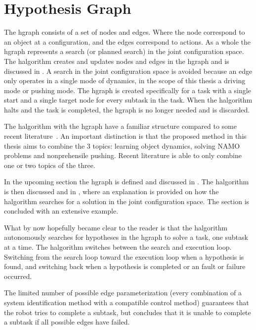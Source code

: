 \section{Hypothesis Graph}%
\label{sec:hgraph}
The \acf{hgraph} consists of a set of nodes and edges. Where the node correspond to an object at a configuration, and the edges correspond to actions. As a whole the \ac{hgraph} represents a search (or planned search) in the joint configuration space. The \ac{halgorithm} creates and updates nodes and edges in the \ac{hgraph} and is discussed in . A search in the joint configuration space is avoided because an edge only operates in a single mode of dynamics, in the scope of this thesis a driving mode or pushing mode. The \ac{hgraph} is created specifically for a task with a single start and a single target node for every subtask in the task. When the \ac{halgorithm} halts and the task is completed, the \ac{hgraph} is no longer needed and is discarded.\bs

The \ac{halgorithm} with the \ac{hgraph} have a familiar structure compared to some recent literature~\cite{ellis_navigation_2022,wang_affordancebased_2020}. An important distinction is that the proposed method in this thesis aims to combine the 3 topics: learning object dynamics, solving \ac{NAMO} problems and nonprehensile pushing. Recent literature is able to only combine one or two topics of the three.\bs

In the upcoming section the \ac{hgraph} is defined and discussed in . The \ac{halgorithm} is then discussed and in , where an explanation is provided on how the \ac{halgorithm} searches for a solution in the joint configuration space. The section is concluded with an extensive example.\bs





What by now hopefully became clear to the reader is that the \ac{halgorithm} autonomously searches for hypotheses in the \ac{hgraph} to solve a task, one subtask at a time. The \ac{halgorithm} switches between the search and execution loop. Switching from the search loop toward the execution loop when a hypothesis is found, and switching back when a hypothesis is completed or an fault or failure occurred.\bs

The limited number of possible edge parameterization (every combination of a system identification method with a compatible control method) guarantees that the robot tries to complete a subtask, but concludes that it is unable to complete a subtask if all possible edges have failed.\bs

